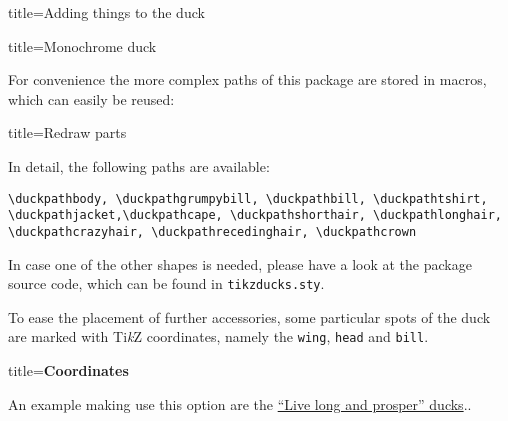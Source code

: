 \documentclass[parskip=half]{scrartcl}
\newcommand{\TikZ}{Ti\emph{k}Z\xspace}
\begin{document}
\begin{tcblisting}{title={Adding things to the duck}}
\end{tcblisting}

\begin{tcblisting}{title={Monochrome duck}}
\end{tcblisting}

For convenience the more complex paths of this package are stored in macros, which can easily be reused:

\begin{tcblisting}{title={Redraw parts}}
\begin{tikzpicture}
	\duck
	\path[preaction={fill, red!50!black},pattern=fivepointed stars, pattern color=yellow]  
			\duckpathlonghair;
\end{tikzpicture}
\end{tcblisting}

In detail, the following paths are available:

\begin{lstlisting}[breakindent=0pt]
\duckpathbody, \duckpathgrumpybill, \duckpathbill, \duckpathtshirt, \duckpathjacket,\duckpathcape, \duckpathshorthair, \duckpathlonghair, \duckpathcrazyhair, \duckpathrecedinghair, \duckpathcrown
\end{lstlisting}

In case one of the other shapes is needed, please have a look at the package source code, which can be found in \lstinline|tikzducks.sty|.

To ease the placement of further accessories, some particular spots of the duck are marked with \TikZ coordinates, namely the \lstinline|wing|, \lstinline|head| and \lstinline|bill|. 

{
\footnotesize\ttfamily
\begin{tcblisting}{title={\normalfont\normalsize\bfseries Coordinates}}
\end{tcblisting}
}
An example making use this option are the \hyperref[starducks]{``Live long and prosper'' ducks}.. 
\end{document}
